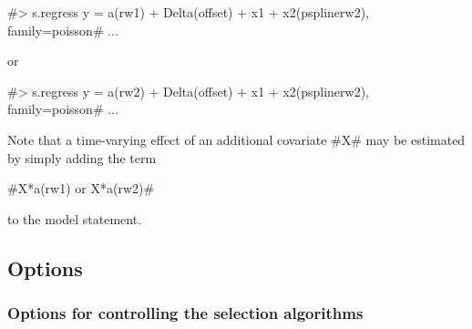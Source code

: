  #> s.regress y = a(rw1) + Delta(offset) + x1 + x2(psplinerw2), family=poisson# $\ldots$

or

 #> s.regress y = a(rw2) + Delta(offset) + x1 + x2(psplinerw2), family=poisson# $\ldots$

Note that a time-varying effect of an additional covariate #X# may
be estimated by simply adding the term

#X*a(rw1) or X*a(rw2)#

to the model statement.

\subsection{Options}
\label{stepwiseregregressoptions}

\subsubsection*{Options for controlling the selection algorithms}
\label{stepwise_options_algorithm}

